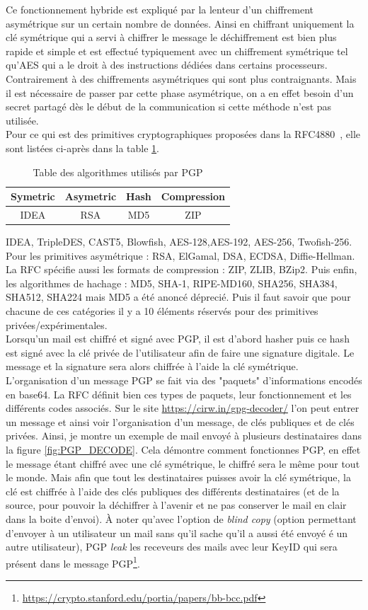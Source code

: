 Ce fonctionnement hybride est expliqué par la lenteur d’un chiffrement asymétrique sur un certain nombre de données. Ainsi en chiffrant uniquement la clé symétrique qui a servi à chiffrer le message le déchiffrement est bien plus rapide et simple et est effectué typiquement avec un chiffrement symétrique tel qu’AES qui a le droit à des instructions dédiées dans certains processeurs. Contrairement à des chiffrements asymétriques qui sont plus contraignants. Mais il est nécessaire de passer par cette phase asymétrique, on a en effet besoin d'un secret partagé dès le début de la communication si cette méthode n'est pas utilisée.\\
Pour ce qui est des primitives cryptographiques proposées dans la RFC4880~\cite{RFC4880}, elle sont listées ci-après dans la table \ref{table:refPGPAlgos}.
\begin{table}[h!]
	\centering
	\begin{tabular}{||c c c c||}
		\hline
		Symetric & Asymetric & Hash & Compression \\ [0.5ex]
		\hline\hline
		IDEA & RSA & MD5 & ZIP \\
	\end{tabular}
\caption{Table des algorithmes utilisés par PGP}
\label{table:refPGPAlgos}
\end{table}
 IDEA, TripleDES, CAST5, Blowfish, AES-128,AES-192, AES-256, Twofish-256. Pour les primitives asymétrique : RSA, ElGamal, DSA, ECDSA, Diffie-Hellman. La RFC spécifie aussi les formats de compression : ZIP, ZLIB, BZip2. Puis enfin, les algorithmes de hachage : MD5, SHA-1, RIPE-MD160, SHA256, SHA384, SHA512, SHA224 mais MD5 a été anoncé déprecié. Puis il faut savoir que pour chacune de ces catégories il y a 10 éléments réservés pour des primitives privées/expérimentales.\\
Lorsqu'un mail est chiffré et signé avec PGP, il est d'abord hasher puis ce hash est signé avec la clé privée de l'utilisateur afin de faire une signature digitale. Le message et la signature sera alors chiffrée à l'aide la clé symétrique.\\
L'organisation d'un message PGP se fait via des "paquets" d'informations encodés en base64. La RFC définit bien ces types de paquets, leur fonctionnement et les différents codes associés. Sur le site \url{https://cirw.in/gpg-decoder/} l'on peut entrer un message et ainsi voir l'organisation d'un message, de clés publiques et de clés privées. Ainsi, je montre un exemple de mail envoyé à plusieurs destinataires dans la figure \ref{fig:PGP_DECODE}. Cela démontre comment fonctionnes PGP, en effet le message étant chiffré avec une clé symétrique, le chiffré sera le même pour tout le monde. Mais afin que tout les destinataires puisses avoir la clé symétrique, la clé est chiffrée à l'aide des clés publiques des différents destinataires (et de la source, pour pouvoir la déchiffrer à l'avenir et ne pas conserver le mail en clair dans la boite d'envoi). À noter qu'avec l'option de \textit{blind copy} (option permettant d'envoyer à un utilisateur un mail sans qu'il sache qu'il a aussi été envoyé é un autre utilisateur), PGP \textit{leak} les receveurs des mails avec leur KeyID qui sera présent dans le message PGP\footnote{\url{https://crypto.stanford.edu/portia/papers/bb-bcc.pdf}}.\\
